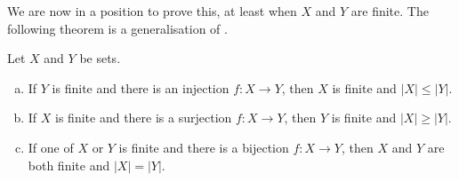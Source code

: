 We are now in a position to prove this, at least when $X$ and $Y$ are finite. The following theorem is a generalisation of .

\begin{theorem}
\label{thmFiniteSetsAndJections}
Let $X$ and $Y$ be sets.
\begin{enumerate}[(a)]
\item If $Y$ is finite and there is an injection $f : X \to Y$, then $X$ is finite and $|X| \le |Y|$.
\item If $X$ is finite and there is a surjection $f : X \to Y$, then $Y$ is finite and $|X| \ge |Y|$.
\item If one of $X$ or $Y$ is finite and there is a bijection $f : X \to Y$, then $X$ and $Y$ are both finite and $|X| = |Y|$.
\end{enumerate}
\end{theorem}


